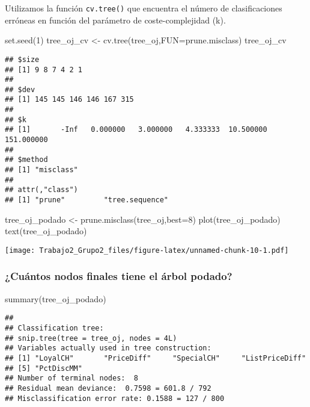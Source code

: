 \documentclass[
]{article}
\newenvironment{Shaded}{\begin{snugshade}}{\end{snugshade}}
\newcommand{\AttributeTok}[1]{\textcolor[rgb]{0.77,0.63,0.00}{#1}}
\newcommand{\DecValTok}[1]{\textcolor[rgb]{0.00,0.00,0.81}{#1}}
\newcommand{\FunctionTok}[1]{\textcolor[rgb]{0.00,0.00,0.00}{#1}}
\newcommand{\NormalTok}[1]{#1}
\newcommand{\OtherTok}[1]{\textcolor[rgb]{0.56,0.35,0.01}{#1}}
\begin{document}
Utilizamos la función \texttt{cv.tree()} que encuentra el número de
clasificaciones erróneas en función del parámetro de coste-complejidad
(k).

\begin{Shaded}
\begin{Highlighting}[]
\FunctionTok{set.seed}\NormalTok{(}\DecValTok{1}\NormalTok{)}
\NormalTok{tree\_oj\_cv }\OtherTok{\textless{}{-}} \FunctionTok{cv.tree}\NormalTok{(tree\_oj,}\AttributeTok{FUN=}\NormalTok{prune.misclass)}
\NormalTok{tree\_oj\_cv}
\end{Highlighting}
\end{Shaded}

\begin{verbatim}
## $size
## [1] 9 8 7 4 2 1
## 
## $dev
## [1] 145 145 146 146 167 315
## 
## $k
## [1]       -Inf   0.000000   3.000000   4.333333  10.500000 151.000000
## 
## $method
## [1] "misclass"
## 
## attr(,"class")
## [1] "prune"         "tree.sequence"
\end{verbatim}

\begin{Shaded}
\begin{Highlighting}[]
\NormalTok{tree\_oj\_podado }\OtherTok{\textless{}{-}} \FunctionTok{prune.misclass}\NormalTok{(tree\_oj,}\AttributeTok{best=}\DecValTok{8}\NormalTok{)}
\FunctionTok{plot}\NormalTok{(tree\_oj\_podado)}
\FunctionTok{text}\NormalTok{(tree\_oj\_podado)}
\end{Highlighting}
\end{Shaded}

\texttt{[image: Trabajo2\_Grupo2\_files/figure-latex/unnamed-chunk-10-1.pdf]}

\hypertarget{cuuxe1ntos-nodos-finales-tiene-el-uxe1rbol-podado}{%
\subsubsection{¿Cuántos nodos finales tiene el árbol
podado?}\label{cuuxe1ntos-nodos-finales-tiene-el-uxe1rbol-podado}}

\begin{Shaded}
\begin{Highlighting}[]
\FunctionTok{summary}\NormalTok{(tree\_oj\_podado)}
\end{Highlighting}
\end{Shaded}

\begin{verbatim}
## 
## Classification tree:
## snip.tree(tree = tree_oj, nodes = 4L)
## Variables actually used in tree construction:
## [1] "LoyalCH"       "PriceDiff"     "SpecialCH"     "ListPriceDiff"
## [5] "PctDiscMM"    
## Number of terminal nodes:  8 
## Residual mean deviance:  0.7598 = 601.8 / 792 
## Misclassification error rate: 0.1588 = 127 / 800
\end{verbatim}
\end{document}
